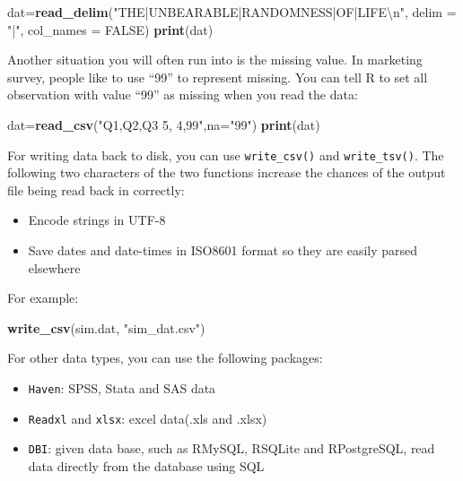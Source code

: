 \documentclass[12pt,]{krantz}
\makeatletter
\newenvironment{Shaded}{\begin{snugshade}}{\end{snugshade}}
\newcommand{\KeywordTok}[1]{\textcolor[rgb]{0.27,0.27,0.27}{\textbf{#1}}}
\newcommand{\DataTypeTok}[1]{\textcolor[rgb]{0.27,0.27,0.27}{#1}}
\newcommand{\CharTok}[1]{\textcolor[rgb]{0.5,0.5,0.5}{#1}}
\newcommand{\StringTok}[1]{\textcolor[rgb]{0.5,0.5,0.5}{#1}}
\newcommand{\OtherTok}[1]{\textcolor[rgb]{0.37,0.37,0.37}{#1}}
\newcommand{\NormalTok}[1]{#1}
\providecommand{\tightlist}{%
  \setlength{\itemsep}{0pt}\setlength{\parskip}{0pt}}
\newenvironment{kframe}{%
\medskip{}
\setlength{\fboxsep}{.8em}
 \def\at@end@of@kframe{}%
 \ifinner\ifhmode%
  \def\at@end@of@kframe{\end{minipage}}%
  \begin{minipage}{\columnwidth}%
 \fi\fi%
 \def\FrameCommand##1{\hskip\@totalleftmargin \hskip-\fboxsep
 \colorbox{shadecolor}{##1}\hskip-\fboxsep
     \hskip-\linewidth \hskip-\@totalleftmargin \hskip\columnwidth}%
 \MakeFramed {\advance\hsize-\width
   \@totalleftmargin\z@ \linewidth\hsize
   \@setminipage}}%
 {\par\unskip\endMakeFramed%
 \at@end@of@kframe}
\renewenvironment{Shaded}{\begin{kframe}}{\end{kframe}}
\theoremstyle{definition}
\theoremstyle{definition}
\theoremstyle{definition}
\theoremstyle{remark}
\makeatother
\begin{document}
\begin{Shaded}
\begin{Highlighting}[]
\NormalTok{dat=}\KeywordTok{read_delim}\NormalTok{(}\StringTok{"THE|UNBEARABLE|RANDOMNESS|OF|LIFE}\CharTok{\textbackslash{}n}\StringTok{"}\NormalTok{, }\DataTypeTok{delim =} \StringTok{"|"}\NormalTok{, }\DataTypeTok{col_names =} \OtherTok{FALSE}\NormalTok{)}
\KeywordTok{print}\NormalTok{(dat)}
\end{Highlighting}
\end{Shaded}

Another situation you will often run into is the missing value. In
marketing survey, people like to use ``99'' to represent missing. You
can tell R to set all observation with value ``99'' as missing when you
read the data:

\begin{Shaded}
\begin{Highlighting}[]
\NormalTok{dat=}\KeywordTok{read_csv}\NormalTok{(}\StringTok{"Q1,Q2,Q3}
\StringTok{               5, 4,99"}\NormalTok{,}\DataTypeTok{na=}\StringTok{"99"}\NormalTok{)}
\KeywordTok{print}\NormalTok{(dat)}
\end{Highlighting}
\end{Shaded}

For writing data back to disk, you can use \texttt{write\_csv()} and
\texttt{write\_tsv()}. The following two characters of the two functions
increase the chances of the output file being read back in correctly:

\begin{itemize}
\tightlist
\item
  Encode strings in UTF-8
\item
  Save dates and date-times in ISO8601 format so they are easily parsed
  elsewhere
\end{itemize}

For example:

\begin{Shaded}
\begin{Highlighting}[]
\KeywordTok{write_csv}\NormalTok{(sim.dat, }\StringTok{"sim_dat.csv"}\NormalTok{)}
\end{Highlighting}
\end{Shaded}

For other data types, you can use the following packages:

\begin{itemize}
\tightlist
\item
  \texttt{Haven}: SPSS, Stata and SAS data
\item
  \texttt{Readxl} and \texttt{xlsx}: excel data(.xls and .xlsx)
\item
  \texttt{DBI}: given data base, such as RMySQL, RSQLite and
  RPostgreSQL, read data directly from the database using SQL
\end{itemize}
\end{document}

